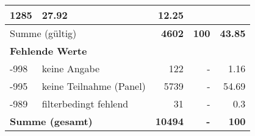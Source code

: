 \begin{longtable}{lXrrr}
       \num{1285} &
       \num[round-mode=places,round-precision=2]{27.92} &
         \num[round-mode=places,round-precision=2]{12.25} \\
     \midrule
     \multicolumn{2}{l}{Summe (gültig)} &
       \textbf{\num{4602}} &
     \textbf{\num{100}} &
       \textbf{\num[round-mode=places,round-precision=2]{43.85}} \\
     \multicolumn{5}{l}{\textbf{Fehlende Werte}}\\
       -998 &
       keine Angabe &
         \num{122} &
        - &
         \num[round-mode=places,round-precision=2]{1.16} \\
       -995 &
       keine Teilnahme (Panel) &
         \num{5739} &
        - &
         \num[round-mode=places,round-precision=2]{54.69} \\
       -989 &
       filterbedingt fehlend &
         \num{31} &
        - &
         \num[round-mode=places,round-precision=2]{0.3} \\
     \midrule
     \multicolumn{2}{l}{\textbf{Summe (gesamt)}} &
          \textbf{\num{10494}} &
        \textbf{-} &
        \textbf{\num{100}} \\
     \bottomrule
     \end{longtable}
     
